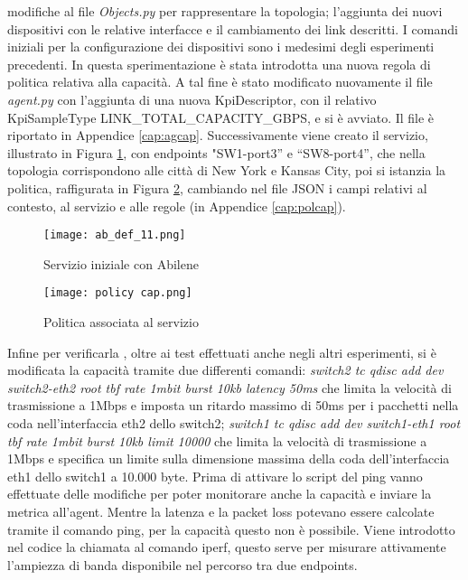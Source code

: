 modifiche al file \textit{Objects.py} per rappresentare la topologia; l'aggiunta dei nuovi dispositivi con le relative interfacce 
e il cambiamento dei link descritti. 
I comandi iniziali per la configurazione dei dispositivi sono i medesimi degli esperimenti precedenti.
\newline In questa sperimentazione è stata introdotta una nuova regola di politica relativa alla capacità.
A tal fine è stato modificato nuovamente il file \textit{agent.py} con l'aggiunta di una nuova KpiDescriptor, con il relativo KpiSampleType LINK\_TOTAL\_CAPACITY\_GBPS, e si è avviato.
Il file è riportato in Appendice \ref{cap:agcap}.
Successivamente viene creato il servizio, illustrato in Figura \ref{fig:abilene}, con endpoints "SW1-port3” e “SW8-port4”, che nella topologia corrispondono alle città di New York e Kansas City,
poi si istanzia la politica, raffigurata in Figura \ref{fig:policy cap}, cambiando nel file JSON i campi relativi
al contesto, al servizio e alle regole (in Appendice \ref{cap:polcap}).
\begin{figure}[h]
    \centering
   \texttt{[image: ab\_def\_11.png]}
    \caption{Servizio iniziale con Abilene}
    \label{fig:abilene}
\end{figure}
\begin{figure}[h]
    \centering
   \texttt{[image: policy cap.png]}
    \caption{Politica associata al servizio}
    \label{fig:policy cap}
\end{figure}
Infine per verificarla , oltre ai test effettuati anche negli altri esperimenti, 
si è modificata la capacità tramite due differenti comandi: \textit{switch2 tc qdisc add dev switch2-eth2 root tbf rate 1mbit burst 10kb latency 50ms} che 
limita la velocità di trasmissione a 1Mbps e imposta un ritardo massimo di 50ms per i pacchetti nella coda nell'interfaccia eth2 dello switch2; 
\textit{switch1 tc qdisc add dev switch1-eth1 root tbf rate 1mbit burst 10kb limit 10000} che
limita la velocità di trasmissione a 1Mbps e specifica un limite sulla dimensione massima della coda dell'interfaccia eth1 dello switch1 a 10.000 byte.
\newline Prima di attivare lo script del ping vanno effettuate delle modifiche per poter monitorare anche la capacità e inviare la metrica all'agent.
Mentre la latenza e la packet loss potevano essere calcolate tramite il comando ping, per la capacità questo non è possibile.
Viene introdotto nel codice la chiamata al comando iperf,
questo serve per misurare attivamente l'ampiezza di banda disponibile nel percorso tra due endpoints.

